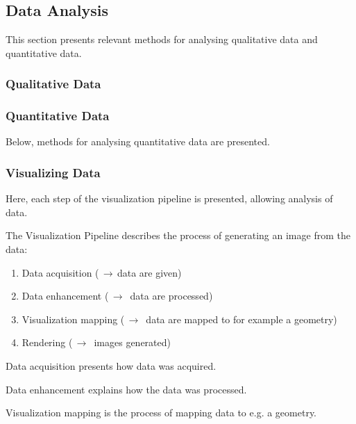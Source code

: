\subsection{Data Analysis} 

This section presents relevant methods for analysing qualitative data and quantitative data.

\subsubsection{Qualitative Data}


\subsubsection{Quantitative Data}
Below, methods for analysing quantitative data are presented.

\subsubsection{Visualizing Data}

Here, each step of the visualization pipeline is presented, allowing analysis of data.

The Visualization Pipeline describes the process of generating an image from the data: \citep{timo-ropinski-liu}

\begin{enumerate}
\item Data acquisition ($\,\to\,$data are given)
\item Data enhancement ($\,\to\,$ data are processed)
\item Visualization mapping ($\,\to\,$ data are mapped to for example a geometry)
\item Rendering ($\,\to\,$ images generated)
\end{enumerate}


Data acquisition presents how data was acquired.

Data enhancement explains how the data was processed.

Visualization mapping is the process of mapping data to e.g. a geometry.

